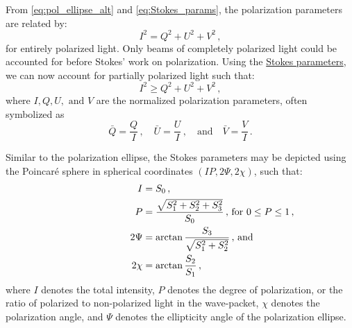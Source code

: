 
From \autoref{eq:pol_ellipse_alt} and \ref{eq:Stokes_params}, the polarization parameters are related by:
\begin{equation}
    {I}^{2} = {Q}^{2} + {U}^{2} + {V}^{2}\,,
\end{equation}
for entirely polarized light.
Only beams of completely polarized light could be accounted for before Stokes' work on polarization.
Using the \hyperref[eq:Stokes_params]{Stokes parameters}, we can now account for partially polarized light such that:
\begin{equation}
    I^{2} \geq  Q^{2} + U^{2} + V^{2}\,,
\end{equation}
where $I, Q, U, \text{ and } V$ are the normalized polarization parameters, often symbolized as
\begin{equation} \label{eq:Stokes_norm}
    \bar{Q} = \frac{Q}{I}\,,\quad \bar{U} = \frac{U}{I}\,,\quad \text{and}\quad \bar{V} = \frac{V}{I}\,.
\end{equation}

Similar to the polarization ellipse, the Stokes parameters may be depicted using the Poincar{\'e} sphere in spherical coordinates $(IP, 2 \Psi, 2 \chi)$, such that:
\begin{equation} \label{eq:poincare_coords}
    \begin{aligned}
        I &= S_{0}\,,\\
        P &= \frac{\sqrt{S_{1}^2 + S_{2}^2 + S_{3}^2}}{S_{0}} \rlap{\,,\ for $0 \leq P \leq 1$\,,}\\
        2 \Psi &= \arctan \frac{S_{3}}{\sqrt{S_{1}^{2} + S_{2}^{2}}} \rlap{\,,\ and}\\
        2 \chi &= \arctan \frac{S_{2}}{S_{1}}\,,
    \end{aligned}
\end{equation}
where $I$ denotes the total intensity, $P$ denotes the degree of polarization, or the ratio of polarized to non-polarized light in the wave-packet, $\chi$ denotes the polarization angle, and $\Psi$ denotes the ellipticity angle of the polarization ellipse.

